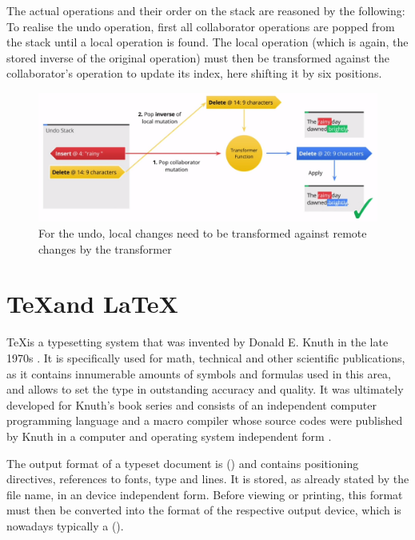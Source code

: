 \pagebreak

The actual operations and their order on the stack are reasoned by the following: To realise the undo operation, first all collaborator operations are popped from the stack until a local operation is found. The local operation (which is again, the stored inverse of the original operation) must then be transformed against the collaborator's operation to update its index, here shifting it by six positions.

\begin{figure}[H] %
	\centering
		\includegraphics[width=\textwidth]{images/ot_transform_redo.png}
	\caption{For the undo, local changes need to be transformed against remote changes by the transformer \cite{website:io2013-drive-api-video}}
\end{figure} 

\section{\TeX and \LaTeX}
\label{sec:tex}

\TeX is a typesetting system that was invented by Donald E. Knuth in the late 1970s \cite{website:knuth}. It is specifically used for math, technical and other scientific publications, as it contains innumerable amounts of symbols and formulas used in this area, and allows to set the type in outstanding accuracy and quality. It was ultimately developed for Knuth's book series  and consists of an independent computer programming language and a macro compiler whose source codes were published by Knuth in a computer and operating system independent form \cite{website:tug}.

The output format of a typeset document is  () and contains positioning directives, references to fonts, type and lines. It is stored, as already stated by the file name, in an device independent form. Before viewing or printing, this format must then be converted into the format of the respective output device, which is nowadays typically a  ().

